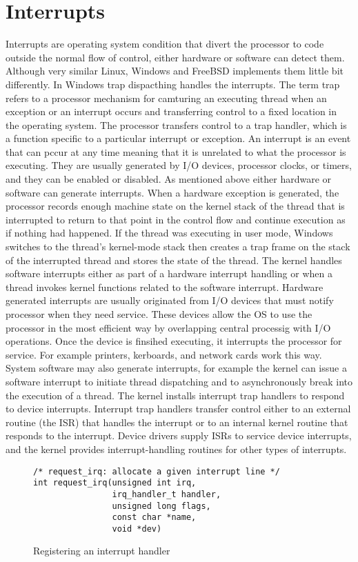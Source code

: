 \documentclass[letterpaper,10pt,draftclsnofoot,onecolumn]{IEEEtran}
\begin{document}
\section*{Interrupts}
Interrupts are operating system condition that divert the processor to code outside the normal flow of control, either hardware or software can detect them. Although very similar Linux, Windows and FreeBSD implements them little bit differently. 
In Windows trap dispacthing handles the interrupts. The term trap refers to a processor mechanism for camturing an executing thread when an exception or an interrupt occurs and transferring control to a fixed location in the operating system. The processor transfers control to a trap handler, which is a function specific to a particular interrupt or exception.\cite{[1]}
An interrupt is an event that can pccur at any time meaning that it is unrelated to what the processor is executing. They are usually generated by I/O devices, processor clocks, or timers, and they can be enabled or disabled. As mentioned above either hardware or software can generate interrupts.
When a hardware exception is generated, the processor records enough machine state on the kernel stack of the thread that is interrupted to return to that point in the control flow and continue execution as if nothing had happened. If the thread was executing in user mode, Windows switches to the thread's kernel-mode stack then creates a trap frame on the stack of the interrupted thread and stores the state of the thread.\cite{[1]}
The kernel handles software interrupts either as part of a hardware interrupt handling or when a thread invokes kernel functions related to the software interrupt.
Hardware generated interrupts are usually originated from I/O devices that must notify processor when they need service. These devices allow the OS to use the processor in the most efficient way by overlapping central processig with I/O operations. Once the device is finsihed executing, it interrupts the processor for service. For example printers, kerboards, and network cards work this way. System software may also generate interrupts, for example the kernel can issue a software interrupt to initiate thread dispatching and to asynchronously break into the execution of a thread.
The kernel installs interrupt trap handlers to respond to device interrupts. Interrupt trap handlers transfer control either to an external routine (the ISR) that handles the interrupt or to an internal kernel routine that responds to the interrupt. Device drivers supply ISRs to service device interrupts, and the kernel provides interrupt-handling routines for other types of interrupts.\cite{[1]}
\begin{figure}[H]
\caption{Registering an interrupt handler}
\begin{lstlisting}
/* request_irq: allocate a given interrupt line */
int request_irq(unsigned int irq,
				irq_handler_t handler,
				unsigned long flags,
				const char *name,
				void *dev)
\end{lstlisting} \cite{linux}
\end{figure}
\end{document}
